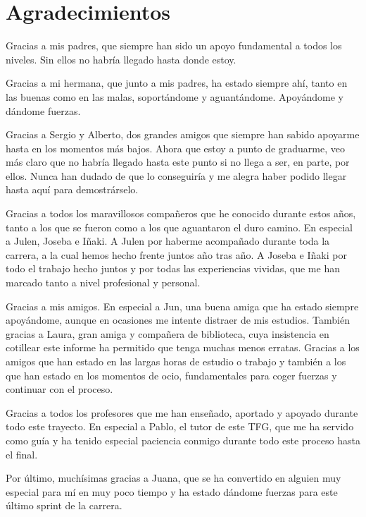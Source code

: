 \chapter{Agradecimientos}

Gracias a mis padres, que siempre han sido un apoyo fundamental a todos los niveles. Sin ellos no habría llegado hasta donde estoy.

Gracias a mi hermana, que junto a mis padres, ha estado siempre ahí, tanto en las buenas como en las malas, soportándome y aguantándome. Apoyándome y dándome fuerzas.

Gracias a Sergio y Alberto, dos grandes amigos que siempre han sabido apoyarme hasta en los momentos más bajos. Ahora que estoy a punto de graduarme, veo más claro que no habría llegado hasta este punto si no llega a ser, en parte, por ellos. Nunca han dudado de que lo conseguiría y me alegra haber podido llegar hasta aquí para demostrárselo.

Gracias a todos los maravillosos compañeros que he conocido durante estos años, tanto a los que se fueron como a los que aguantaron el duro camino. En especial a Julen, Joseba e Iñaki. A Julen por haberme acompañado durante toda la carrera, a la cual hemos hecho frente juntos año tras año. A Joseba e Iñaki por todo el trabajo hecho juntos y por todas las experiencias vividas, que me han marcado tanto a nivel profesional y personal.

Gracias a mis amigos. En especial a Jun, una buena amiga que ha estado siempre apoyándome, aunque en ocasiones me intente distraer de mis estudios. También gracias a Laura, gran amiga y compañera de biblioteca, cuya insistencia en cotillear este informe ha permitido que tenga muchas menos erratas. Gracias a los amigos que han estado en las largas horas de estudio o trabajo y también a los que han estado en los momentos de ocio, fundamentales para coger fuerzas y continuar con el proceso.

Gracias a todos los profesores que me han enseñado, aportado y apoyado durante todo este trayecto. En especial a Pablo, el tutor de este TFG, que me ha servido como guía y ha tenido especial paciencia conmigo durante todo este proceso hasta el final.

Por último, muchísimas gracias a Juana, que se ha convertido en alguien muy especial para mí en muy poco tiempo y ha estado dándome fuerzas para este último sprint de la carrera. 